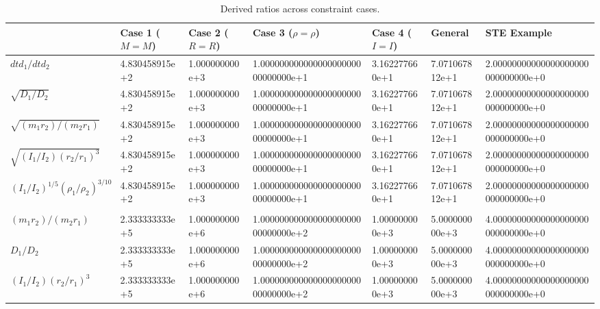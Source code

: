 \begin{table}[ht]
\centering
\caption{Derived ratios across constraint cases.}
\label{tab:pair_ratios}
\scriptsize
\setlength{\tabcolsep}{2pt}
\begin{tabular}{@{} l l l l l l l @{}}
\toprule
 & \textbf{Case 1 ($M\!=\!M$)} & \textbf{Case 2 ($R\!=\!R$)} & \textbf{Case 3 ($\rho\!=\!\rho$)} & \textbf{Case 4 ($I\!=\!I$)} & \textbf{General} & \textbf{STE Example} \\
\midrule
$dtd_1/dtd_2$ & {\ttfamily 4.830458915e+2} & {\ttfamily 1.000000000e+3} & {\ttfamily 1.00000000000000000000000000000e+1} & {\ttfamily 3.162277660e+1} & {\ttfamily 7.071067812e+1} & {\ttfamily 2.00000000000000000000000000000e+0} \\
$\sqrt{D_1/D_2}$ & {\ttfamily 4.830458915e+2} & {\ttfamily 1.000000000e+3} & {\ttfamily 1.00000000000000000000000000000e+1} & {\ttfamily 3.162277660e+1} & {\ttfamily 7.071067812e+1} & {\ttfamily 2.00000000000000000000000000000e+0} \\
$\sqrt{(m_1 r_2)/(m_2 r_1)}$ & {\ttfamily 4.830458915e+2} & {\ttfamily 1.000000000e+3} & {\ttfamily 1.00000000000000000000000000000e+1} & {\ttfamily 3.162277660e+1} & {\ttfamily 7.071067812e+1} & {\ttfamily 2.00000000000000000000000000000e+0} \\
$\sqrt{(I_1/I_2)(r_2/r_1)^3}$ & {\ttfamily 4.830458915e+2} & {\ttfamily 1.000000000e+3} & {\ttfamily 1.00000000000000000000000000000e+1} & {\ttfamily 3.162277660e+1} & {\ttfamily 7.071067812e+1} & {\ttfamily 2.00000000000000000000000000000e+0} \\
$(I_1/I_2)^{1/5}(\rho_1/\rho_2)^{3/10}$ & {\ttfamily 4.830458915e+2} & {\ttfamily 1.000000000e+3} & {\ttfamily 1.00000000000000000000000000000e+1} & {\ttfamily 3.162277660e+1} & {\ttfamily 7.071067812e+1} & {\ttfamily 2.00000000000000000000000000000e+0} \\
[3pt]\hline\\[-6pt]
$(m_1 r_2)/(m_2 r_1)$ & {\ttfamily 2.333333333e+5} & {\ttfamily 1.000000000e+6} & {\ttfamily 1.00000000000000000000000000000e+2} & {\ttfamily 1.000000000e+3} & {\ttfamily 5.000000000e+3} & {\ttfamily 4.00000000000000000000000000000e+0} \\
$D_1/D_2$ & {\ttfamily 2.333333333e+5} & {\ttfamily 1.000000000e+6} & {\ttfamily 1.00000000000000000000000000000e+2} & {\ttfamily 1.000000000e+3} & {\ttfamily 5.000000000e+3} & {\ttfamily 4.00000000000000000000000000000e+0} \\
$(I_1/I_2)(r_2/r_1)^3$ & {\ttfamily 2.333333333e+5} & {\ttfamily 1.000000000e+6} & {\ttfamily 1.00000000000000000000000000000e+2} & {\ttfamily 1.000000000e+3} & {\ttfamily 5.000000000e+3} & {\ttfamily 4.00000000000000000000000000000e+0} \\

\end{tabular}
\end{table}
